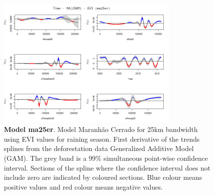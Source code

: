 \begin{table}


\begin{figure}[H]
 \centering
        \centering
        \includegraphics[width=0.8\textwidth]{ma25er.png} %
        \caption[Model Cerrado Maranhão for 25km bandwidth using EVI values for raining season. First derivative of the trends splines from the deforestation data Generalized Additive Model (GAM)]{\textbf{Model ma25er}. Model Maranhão Cerrado for 25km bandwidth using EVI values for raining season. First derivative of the trends splines from the deforestation data Generalized Additive Model (GAM). The grey band is a 99\% simultaneous point-wise confidence interval. Sections of the spline where the confidence interval does not include zero are indicated by coloured sections. Blue colour means positive values and red colour means negative values.}
\end{figure}
\end{table}

